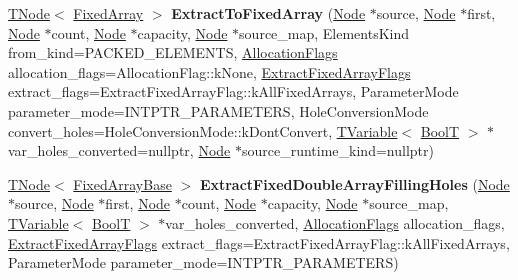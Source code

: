 \begin{DoxyCompactItemize}
\mbox{\hyperlink{classv8_1_1internal_1_1compiler_1_1TNode}{T\+Node}}$<$ \mbox{\hyperlink{classv8_1_1internal_1_1FixedArray}{Fixed\+Array}} $>$ {\bfseries Extract\+To\+Fixed\+Array} (\mbox{\hyperlink{classv8_1_1internal_1_1compiler_1_1Node}{Node}} $\ast$source, \mbox{\hyperlink{classv8_1_1internal_1_1compiler_1_1Node}{Node}} $\ast$first, \mbox{\hyperlink{classv8_1_1internal_1_1compiler_1_1Node}{Node}} $\ast$count, \mbox{\hyperlink{classv8_1_1internal_1_1compiler_1_1Node}{Node}} $\ast$capacity, \mbox{\hyperlink{classv8_1_1internal_1_1compiler_1_1Node}{Node}} $\ast$source\+\_\+map, Elements\+Kind from\+\_\+kind=P\+A\+C\+K\+E\+D\+\_\+\+E\+L\+E\+M\+E\+N\+TS, \mbox{\hyperlink{classv8_1_1base_1_1Flags}{Allocation\+Flags}} allocation\+\_\+flags=Allocation\+Flag\+::k\+None, \mbox{\hyperlink{classv8_1_1base_1_1Flags}{Extract\+Fixed\+Array\+Flags}} extract\+\_\+flags=Extract\+Fixed\+Array\+Flag\+::k\+All\+Fixed\+Arrays, Parameter\+Mode parameter\+\_\+mode=I\+N\+T\+P\+T\+R\+\_\+\+P\+A\+R\+A\+M\+E\+T\+E\+RS, Hole\+Conversion\+Mode convert\+\_\+holes=Hole\+Conversion\+Mode\+::k\+Dont\+Convert, \mbox{\hyperlink{classv8_1_1internal_1_1compiler_1_1TypedCodeAssemblerVariable}{T\+Variable}}$<$ \mbox{\hyperlink{structv8_1_1internal_1_1BoolT}{BoolT}} $>$ $\ast$var\+\_\+holes\+\_\+converted=nullptr, \mbox{\hyperlink{classv8_1_1internal_1_1compiler_1_1Node}{Node}} $\ast$source\+\_\+runtime\+\_\+kind=nullptr)
\item 
\mbox{\label{classv8_1_1internal_1_1CodeStubAssembler_a498b7c6025c421492de6817a1dd45dbf}} 
\mbox{\hyperlink{classv8_1_1internal_1_1compiler_1_1TNode}{T\+Node}}$<$ \mbox{\hyperlink{classv8_1_1internal_1_1FixedArrayBase}{Fixed\+Array\+Base}} $>$ {\bfseries Extract\+Fixed\+Double\+Array\+Filling\+Holes} (\mbox{\hyperlink{classv8_1_1internal_1_1compiler_1_1Node}{Node}} $\ast$source, \mbox{\hyperlink{classv8_1_1internal_1_1compiler_1_1Node}{Node}} $\ast$first, \mbox{\hyperlink{classv8_1_1internal_1_1compiler_1_1Node}{Node}} $\ast$count, \mbox{\hyperlink{classv8_1_1internal_1_1compiler_1_1Node}{Node}} $\ast$capacity, \mbox{\hyperlink{classv8_1_1internal_1_1compiler_1_1Node}{Node}} $\ast$source\+\_\+map, \mbox{\hyperlink{classv8_1_1internal_1_1compiler_1_1TypedCodeAssemblerVariable}{T\+Variable}}$<$ \mbox{\hyperlink{structv8_1_1internal_1_1BoolT}{BoolT}} $>$ $\ast$var\+\_\+holes\+\_\+converted, \mbox{\hyperlink{classv8_1_1base_1_1Flags}{Allocation\+Flags}} allocation\+\_\+flags, \mbox{\hyperlink{classv8_1_1base_1_1Flags}{Extract\+Fixed\+Array\+Flags}} extract\+\_\+flags=Extract\+Fixed\+Array\+Flag\+::k\+All\+Fixed\+Arrays, Parameter\+Mode parameter\+\_\+mode=I\+N\+T\+P\+T\+R\+\_\+\+P\+A\+R\+A\+M\+E\+T\+E\+RS)

\end{DoxyCompactItemize}
